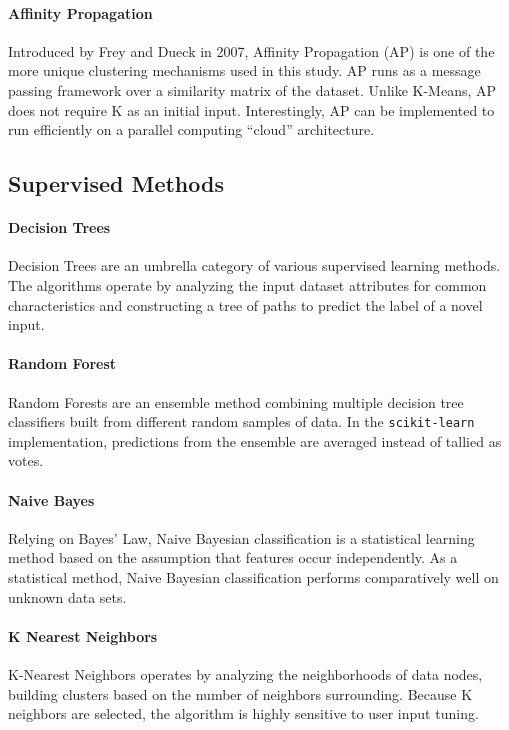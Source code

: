 \documentclass[letterpaper,10pt]{article}
\begin{document}
\paragraph{Affinity Propagation} Introduced by Frey and Dueck in 2007,
Affinity Propagation\cite{frey2007} (AP) is one of the more unique
clustering mechanisms used in this study. AP runs as a message passing
framework over a similarity matrix of the dataset. Unlike K-Means, AP does
not require K as an initial input.  Interestingly, AP can be implemented to
run efficiently on a parallel computing ``cloud''
architecture.\cite{rose2013}

\subsection{Supervised Methods}

\paragraph{Decision Trees} Decision Trees are an umbrella category of
various supervised learning methods. The algorithms operate by analyzing
the input dataset attributes for common characteristics and constructing a
tree of paths to predict the label of a novel input.

\paragraph{Random Forest} Random Forests\cite{breiman2001} are an ensemble
method combining multiple decision tree classifiers built from different
random samples of data. In the \texttt{scikit-learn} implementation,
predictions from the ensemble are averaged instead of tallied as votes.


\paragraph{Naive Bayes} Relying on Bayes' Law, Naive Bayesian
classification is a statistical learning method based on the assumption
that features occur independently. As a statistical method, Naive Bayesian
classification performs comparatively well on unknown data sets.

\paragraph{K Nearest Neighbors} K-Nearest Neighbors operates by analyzing
the neighborhoods of data nodes, building clusters based on the number of
neighbors surrounding. Because K neighbors are selected, the algorithm is
highly sensitive to user input tuning.
\end{document}
